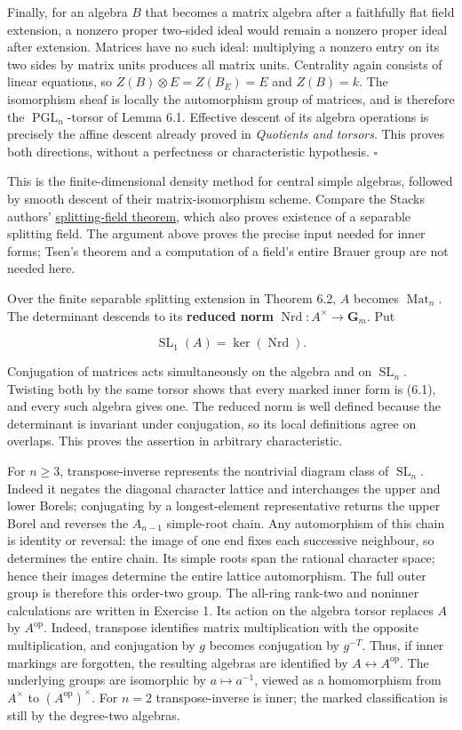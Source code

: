 \documentclass[11pt,a4paper,openany]{report}
\begin{document}
Finally, for an algebra \(B\) that becomes a matrix algebra after a faithfully flat field extension, a nonzero proper two-sided ideal would remain a nonzero proper ideal after extension. Matrices have no such ideal: multiplying a nonzero entry on its two sides by matrix units produces all matrix units. Centrality again consists of linear equations, so \(Z(B)\otimes E=Z(B_E)=E\) and \(Z(B)=k\). The isomorphism sheaf is locally the automorphism group of matrices, and is therefore the \(\operatorname{PGL}_n\)-torsor of Lemma 6.1. Effective descent of its algebra operations is precisely the affine descent already proved in \emph{Quotients and torsors}. This proves both directions, without a perfectness or characteristic hypothesis. \(\square\)

This is the finite-dimensional density method for central simple algebras, followed by smooth descent of their matrix-isomorphism scheme. Compare the Stacks authors' \href{https://stacks.math.columbia.edu/tag/074X}{splitting-field theorem}, which also proves existence of a separable splitting field. The argument above proves the precise input needed for inner forms; Tsen's theorem and a computation of a field's entire Brauer group are not needed here.

Over the finite separable splitting extension in Theorem 6.2, \(A\) becomes \(\operatorname{Mat}_n\). The determinant descends to its \textbf{reduced norm} \(\operatorname{Nrd}:A^\times\to\mathbf G_m\). Put

\[
\operatorname{SL}_1(A)=\ker(\operatorname{Nrd}).
\tag{6.1}
\]

Conjugation of matrices acts simultaneously on the algebra and on \(\operatorname{SL}_n\). Twisting both by the same torsor shows that every marked inner form is (6.1), and every such algebra gives one. The reduced norm is well defined because the determinant is invariant under conjugation, so its local definitions agree on overlaps. This proves the assertion in arbitrary characteristic.

For \(n\geq3\), transpose-inverse represents the nontrivial diagram class of \(\operatorname{SL}_n\). Indeed it negates the diagonal character lattice and interchanges the upper and lower Borels; conjugating by a longest-element representative returns the upper Borel and reverses the \(A_{n-1}\) simple-root chain. Any automorphism of this chain is identity or reversal: the image of one end fixes each successive neighbour, so determines the entire chain. Its simple roots span the rational character space; hence their images determine the entire lattice automorphism. The full outer group is therefore this order-two group. The all-ring rank-two and noninner calculations are written in Exercise 1. Its action on the algebra torsor replaces \(A\) by \(A^{\mathrm{op}}\). Indeed, transpose identifies matrix multiplication with the opposite multiplication, and conjugation by \(g\) becomes conjugation by \(g^{-T}\). Thus, if inner markings are forgotten, the resulting algebras are identified by \(A\leftrightarrow A^{\mathrm{op}}\). The underlying groups are isomorphic by \(a\mapsto a^{-1}\), viewed as a homomorphism from \(A^\times\) to \((A^{\mathrm{op}})^\times\). For \(n=2\) transpose-inverse is inner; the marked classification is still by the degree-two algebras.
\end{document}
